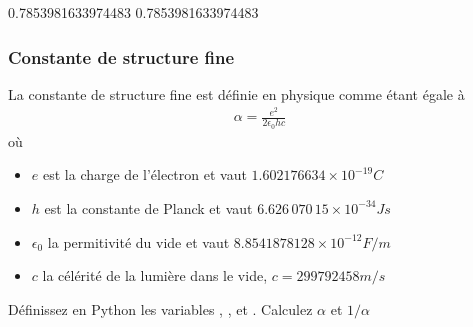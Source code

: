 \documentclass[letterpaper,10pt,english]{sphinxhowto}
\begin{document}
\begin{sphinxVerbatim}[commandchars=\\\{\}]
    

\end{sphinxVerbatim}

\begin{sphinxVerbatim}[commandchars=\\\{\}]
0.7853981633974483
0.7853981633974483
\end{sphinxVerbatim}


\subsubsection{Constante de structure fine}
\label{\detokenize{cours2_nombres_corr_exercices:constante-de-structure-fine}}
\sphinxAtStartPar
La constante de structure fine est définie en physique comme étant égale à
\begin{equation*}
\begin{split} 
\alpha = \frac{e^2}{2\epsilon_0 h c}
\end{split}
\end{equation*}
\sphinxAtStartPar
où
\begin{itemize}
\item {} 
\sphinxAtStartPar
\(e\) est la charge de l’électron et vaut \(1.602176634 \times 10^{-19} C\)

\item {} 
\sphinxAtStartPar
\(h\) est la constante de Planck et vaut \(6.626\,070\,15 \times 10^{-34} J s\)

\item {} 
\sphinxAtStartPar
\(\epsilon_0\) la permitivité du vide et vaut \(8.8541878128 \times 10^{-12} F/m\)

\item {} 
\sphinxAtStartPar
\(c\) la célérité de la lumière dans le vide, \(c=299792458 m/s\)

\end{itemize}

\sphinxAtStartPar
Définissez en Python les variables , ,  et . Calculez \(\alpha\) et \(1/\alpha\)
\end{document}
